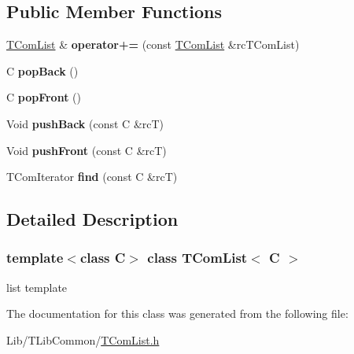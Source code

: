 \subsection*{Public Member Functions}
\begin{DoxyCompactItemize}
\item 
\mbox{\label{class_t_com_list_a986db99c7f30341fbd70c7b6384c9b58}} 
\hyperlink{class_t_com_list}{T\+Com\+List} \& {\bfseries operator+=} (const \hyperlink{class_t_com_list}{T\+Com\+List} \&rc\+T\+Com\+List)
\item 
\mbox{\label{class_t_com_list_a0eb1632c0c5cab06efb86bb71510111f}} 
C {\bfseries pop\+Back} ()
\item 
\mbox{\label{class_t_com_list_a65ac506f0e629575ab66653bdaffa0ba}} 
C {\bfseries pop\+Front} ()
\item 
\mbox{\label{class_t_com_list_a2c8752a6e3c7d4607ab83783dc0541c0}} 
Void {\bfseries push\+Back} (const C \&rcT)
\item 
\mbox{\label{class_t_com_list_a06d1ce6bc779bdf1ecddeb3de403b6a8}} 
Void {\bfseries push\+Front} (const C \&rcT)
\item 
\mbox{\label{class_t_com_list_a9f5d81a6da9ac30dfe89666f2f8f3338}} 
T\+Com\+Iterator {\bfseries find} (const C \&rcT)
\end{DoxyCompactItemize}


\subsection{Detailed Description}
\subsubsection*{template$<$class C$>$\newline
class T\+Com\+List$<$ C $>$}

list template 

The documentation for this class was generated from the following file\+:\begin{DoxyCompactItemize}
\item 
Lib/\+T\+Lib\+Common/\hyperlink{_t_com_list_8h}{T\+Com\+List.\+h}\end{DoxyCompactItemize}
